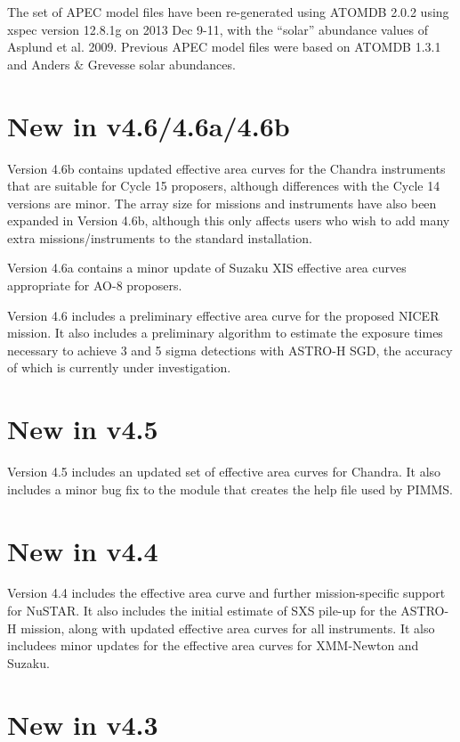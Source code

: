 The set of APEC model files have been re-generated using ATOMDB 2.0.2 using
xspec version 12.8.1g on 2013 Dec 9-11, with the ``solar'' abundance values of
Asplund et al. 2009.  Previous APEC model files were based on ATOMDB 1.3.1 and
Anders \& Grevesse solar abundances.

\section{New in v4.6/4.6a/4.6b}

Version 4.6b contains updated effective area curves for the Chandra
instruments that are suitable for Cycle 15 proposers, although differences
with the Cycle 14 versions are minor.  The array size for missions and
instruments have also been expanded in Version 4.6b, although this only
affects users who wish to add many extra missions/instruments to the
standard installation.

Version 4.6a contains a minor update of Suzaku XIS effective area curves
appropriate for AO-8 proposers.

Version 4.6 includes a preliminary effective area curve for the proposed
NICER mission.  It also includes a preliminary algorithm to estimate the
exposure times necessary to achieve 3 and 5 sigma detections with ASTRO-H
SGD, the accuracy of which is currently under investigation.

\section{New in v4.5}

Version 4.5 includes an updated set of effective area curves for Chandra.
It also includes a minor bug fix to the module that creates the help file
used by PIMMS.

\section{New in v4.4}

Version 4.4 includes the effective area curve and further mission-specific
support for NuSTAR.  It also includes the initial estimate of SXS pile-up
for the ASTRO-H mission, along with updated effective area curves for all
instruments.  It also includees minor updates for the effective area curves
for XMM-Newton and Suzaku.

\section{New in v4.3}

